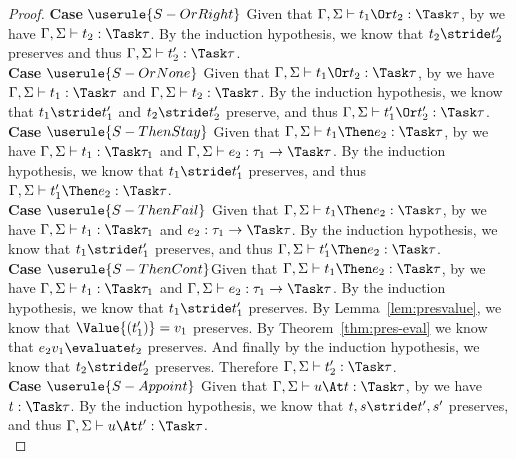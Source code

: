 \begin{proof}
  \noindent\textbf{Case} $\userule{S-OrRight}$ Given that
  $\Gamma,\Sigma\infers t_1\Or t_2:\Task\tau$, by  we have $\Gamma,\Sigma\infers t_2:\Task\tau$. By the induction hypothesis, we know that
  $t_2\stride t_2'$ preserves and thus $\Gamma,\Sigma\infers t_2':\Task\tau$.\\

  \noindent\textbf{Case} $\userule{S-OrNone}$ Given that
  $\Gamma,\Sigma\infers t_1\Or t_2:\Task\tau$, by  we have
  $\Gamma,\Sigma\infers t_1:\Task\tau$ and $\Gamma,\Sigma\infers t_2:\Task\tau$.
  By the induction hypothesis, we know that $t_1\stride t_1'$ and
  $t_2\stride t_2'$ preserve, and thus
  $\Gamma,\Sigma\infers t_1'\Or t_2':\Task\tau$.\\

  \noindent\textbf{Case} $\userule{S-ThenStay}$ Given that
  $\Gamma,\Sigma\infers t_1\Then e_2:\Task\tau$,
  by  we have $\Gamma,\Sigma\infers t_1:\Task\tau_1$ and
  $\Gamma,\Sigma\infers e_2:\tau_1\to\Task\tau$. By the induction
  hypothesis, we know that $t_1\stride t_1'$ preserves, and thus
  $\Gamma,\Sigma\infers t_1'\Then e_2:\Task\tau$.\\

  \noindent\textbf{Case} $\userule{S-ThenFail}$ Given that
  $\Gamma,\Sigma\infers t_1\Then e_2:\Task\tau$,
  by  we have $\Gamma,\Sigma\infers t_1:\Task\tau_1$ and
  $e_2:\tau_1\to\Task\tau$. By the induction
  hypothesis, we know that $t_1\stride t_1'$ preserves, and thus
  $\Gamma,\Sigma\infers t_1'\Then e_2:\Task\tau$.\\

  \noindent\textbf{Case} $\userule{S-ThenCont}$Given that
  $\Gamma,\Sigma\infers t_1\Then e_2:\Task\tau$, by  we have
  $\Gamma,\Sigma\infers t_1:\Task\tau_1$ and
  $\Gamma,\Sigma\infers e_2:\tau_1\to\Task\tau$. By the induction hypothesis, we
  know that $t_1\stride t_1'$ preserves. By Lemma~\ref{lem:presvalue}, we know
  that $\Value{(t_1')}=v_1$ preserves. By Theorem~\ref{thm:pres-eval} we know
  that $e_2 v_1\evaluate t_2$ preserves. And finally by the induction hypothesis,
  we know that $t_2\stride t_2'$ preserves. Therefore
  $\Gamma,\Sigma\infers t_2':\Task\tau$.\\

  \noindent\textbf{Case} $\userule{S-Appoint}$ Given that
  $\Gamma,\Sigma\infers u\At t:\Task\tau$, by  we have
  $t:\Task\tau$. By the induction hypothesis, we know that $t,s\stride t',s'$
  preserves, and thus $\Gamma,\Sigma\infers u\At t':\Task\tau$.\\

\end{proof}

